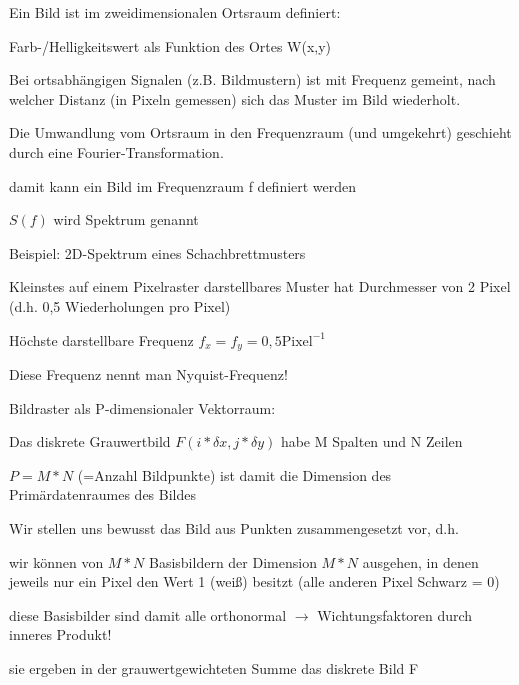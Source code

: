 \documentclass[landscape]{article}
\begin{document}
\begin{multicols}{3}
  Ein Bild ist im zweidimensionalen Ortsraum definiert:
  \begin{itemize*}
    \item Farb-/Helligkeitswert als Funktion des Ortes W(x,y)
    \item Bei ortsabhängigen Signalen (z.B. Bildmustern) ist mit Frequenz gemeint, nach welcher Distanz (in Pixeln gemessen) sich das Muster im Bild wiederholt.
    \item Die Umwandlung vom Ortsraum in den Frequenzraum (und umgekehrt) geschieht durch eine Fourier-Transformation.
    \begin{itemize*}
      \item damit kann ein Bild im Frequenzraum f definiert werden
      \item $S(f)$ wird Spektrum genannt
    \end{itemize*}
  \end{itemize*}
  
  
  Beispiel: 2D-Spektrum eines Schachbrettmusters
  \begin{itemize*}
    \item Kleinstes auf einem Pixelraster darstellbares Muster hat Durchmesser von 2 Pixel (d.h. 0,5 Wiederholungen pro Pixel)
    \item Höchste darstellbare Frequenz $f_x = f_y = 0,5 \text{Pixel}^{-1}$
    \item Diese Frequenz nennt man Nyquist-Frequenz!
  \end{itemize*}
  
  Bildraster als P-dimensionaler Vektorraum:
  \begin{itemize*}
    \item Das diskrete Grauwertbild $F (i* \delta x, j * \delta y )$ habe M Spalten und N Zeilen
    \item $P = M * N$ (=Anzahl Bildpunkte) ist damit die Dimension des Primärdatenraumes des Bildes
    \item Wir stellen uns bewusst das Bild aus Punkten zusammengesetzt vor, d.h.
    \begin{itemize*}
      \item wir können von $M * N$ Basisbildern der Dimension $M * N$ ausgehen, in denen jeweils nur ein Pixel den Wert 1 (weiß) besitzt (alle anderen Pixel Schwarz = 0)
      \item diese Basisbilder sind damit alle orthonormal $\rightarrow$ Wichtungsfaktoren durch inneres Produkt!
      \item sie ergeben in der grauwertgewichteten Summe das diskrete Bild F
    \end{itemize*}
  \end{itemize*}
  

\end{multicols}
\end{document}
